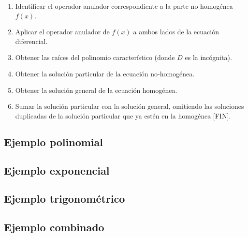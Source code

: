 \begin{enumerate}
    \item Identificar el operador anulador correspondiente a la parte no-homogénea $f(x)$.

    \item Aplicar el operador anulador de $f(x)$ a ambos lados de la ecuación diferencial.

    \item Obtener las raíces del polinomio característico (donde $D$ es la incógnita).

    \item Obtener la solución particular de la ecuación no-homogénea.

    \item Obtener la solución general de la ecuación homogénea.


    \item Sumar la solución particular con la solución general, omitiendo las soluciones duplicadas de la solución particular que ya estén en la homogénea [FIN].
\end{enumerate}


\subsection{Ejemplo polinomial}

\subsection{Ejemplo exponencial}

\subsection{Ejemplo trigonométrico}

\subsection{Ejemplo combinado}

